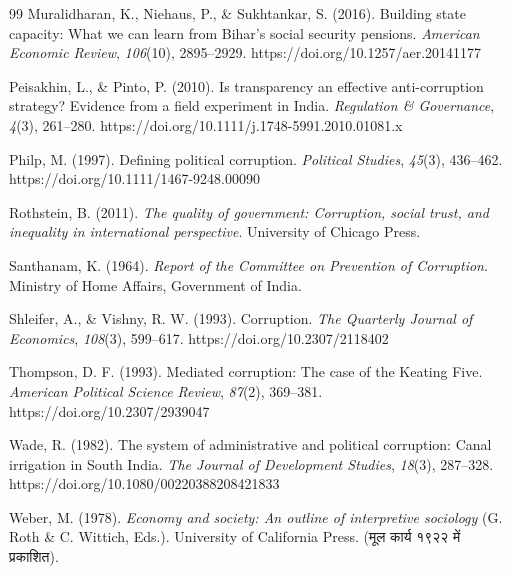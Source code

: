 \documentclass[11pt, a4paper]{article}
\begin{document}
\begin{thebibliography}{99}
Muralidharan, K., Niehaus, P., \& Sukhtankar, S. (2016).
\newblock Building state capacity: What we can learn from Bihar's social security pensions.
\newblock \emph{American Economic Review}, \emph{106}(10), 2895--2929.
\newblock https://doi.org/10.1257/aer.20141177

Peisakhin, L., \& Pinto, P. (2010).
\newblock Is transparency an effective anti-corruption strategy? Evidence from a field experiment in India.
\newblock \emph{Regulation \& Governance}, \emph{4}(3), 261--280.
\newblock https://doi.org/10.1111/j.1748-5991.2010.01081.x

Philp, M. (1997).
\newblock Defining political corruption.
\newblock \emph{Political Studies}, \emph{45}(3), 436--462.
\newblock https://doi.org/10.1111/1467-9248.00090

Rothstein, B. (2011).
\newblock \emph{The quality of government: Corruption, social trust, and inequality in international perspective}.
\newblock University of Chicago Press.

Santhanam, K. (1964).
\newblock \emph{Report of the Committee on Prevention of Corruption}.
\newblock Ministry of Home Affairs, Government of India.

Shleifer, A., \& Vishny, R. W. (1993).
\newblock Corruption.
\newblock \emph{The Quarterly Journal of Economics}, \emph{108}(3), 599--617.
\newblock https://doi.org/10.2307/2118402

Thompson, D. F. (1993).
\newblock Mediated corruption: The case of the Keating Five.
\newblock \emph{American Political Science Review}, \emph{87}(2), 369--381.
\newblock https://doi.org/10.2307/2939047

Wade, R. (1982).
\newblock The system of administrative and political corruption: Canal irrigation in South India.
\newblock \emph{The Journal of Development Studies}, \emph{18}(3), 287--328.
\newblock https://doi.org/10.1080/00220388208421833

Weber, M. (1978).
\newblock \emph{Economy and society: An outline of interpretive sociology} (G. Roth \& C. Wittich, Eds.).
\newblock University of California Press. (मूल कार्य १९२२ में प्रकाशित).

\end{thebibliography}
\end{document}
